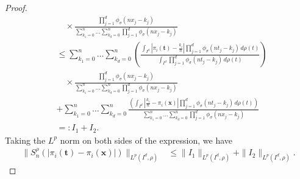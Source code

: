 \documentclass[10pt,a4paper]{amsart}
\newcommand{\LP}{L^p(I^d, \rho)}
\newcommand{\X}{\mathbf{x}}
\begin{document}
\begin{proof}
\begin{align*}
&\quad  \times \frac{\prod_{j=1}^d \phi_\sigma(nx_j - k_j)}{\sum_{k_1=0}^n \ldots \sum_{k_d=0}^n \prod_{j=1}^d \phi_\sigma(nx_j - k_j)} \\
&\leq \sum_{k_1=0}^n \ldots \sum_{k_d=0}^n \left( \frac{\int_{I^d} |\pi_i(\mathbf{t}) - \frac{k_i}{n}| \prod_{j=1}^d \phi_\sigma(nt_j - k_j) \, d\rho(t)}{\int_{I^d} \prod_{j=1}^d \phi_\sigma(nt_j - k_j) \, d\rho(t)} \right)  \\
&\quad  \times \frac{\prod_{j=1}^d \phi_\sigma(nx_j - k_j)}{\sum_{k_1=0}^n \ldots \sum_{k_d=0}^n \prod_{j=1}^d \phi_\sigma(nx_j - k_j)}  \\
&+ \sum_{k_1=0}^n \ldots \sum_{k_d=0}^n \frac{\left( \int_{I^d} \left| \frac{k_i}{n} - \pi_i(\X) \right| \prod_{j=1}^d \phi_\sigma(nt_j - k_j) \, d\rho(t) \right)}{\sum_{k_1=0}^n \ldots \sum_{k_d=0}^n \prod_{j=1}^d \phi_\sigma(nx_j - k_j)} \\
&=: I_1 + I_2.
\end{align*} 
Taking the $L^p$ norm on both sides of the expression, we have 
\begin{align} 
\|S^{\rho}_n(|\pi_i(\mathbf{t})-\pi_i(\X)|)\|_{\LP} 
&\leq \|I_1\|_{\LP} + \|I_2\|_{\LP}. \label{msumesti} 
\end{align} 


\end{proof}
\end{document}
